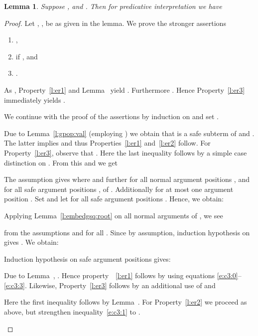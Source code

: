 \documentclass{LMCS}
\newtheorem{lemma}[thm]{Lemma}
\begin{document}
\begin{lemma}\label{l:embed:root}
  Suppose ,  and . 
  Then for predicative interpretation 
  we have 
  
\end{lemma}
\begin{proof}
  Let , ,  be as given in the lemma.
  We prove the stronger assertions
  \begin{enumerate}[labelsep=*,leftmargin=*]
  \item \label{l:er1} , 
  \item \label{l:er2}  if , and
  \item \label{l:er3} .
  \end{enumerate}
As , 
Property~\ref{l:er1} and Lemma~
yield  .
Furthermore
. 
Hence Property~\ref{l:er3} immediately
yields .


We continue with the proof of the assertions by induction on  
and set .
\begin{description}[leftmargin=0.3cm]
  \item[{\dcase{}}]
Due to Lemma~\ref{l:gpop:val} (employing ) 
we obtain that  is a safe subterm of 
and .
The latter implies  and thus
Properties~\ref{l:er1} and~\ref{l:er2} follow.
For Property~\ref{l:er3}, observe that 
    .
Here the last inequality follows by a simple case distinction on .
From this and  we get


  \item[\dcase{}]
    The assumption gives  where 
    and further  for all normal argument positions , and
     for all safe argument positions , of . 
    Additionally  for at most one argument position .
Set  and 
    let  for all safe argument positions 
    . Hence, we obtain:

    Applying Lemma~\ref{l:embedgsq:root} on all normal arguments of , we see
    
    from the assumptions  and  for all .
    Since  by assumption, induction hypothesis on  gives 
.
We obtain:

Induction hypothesis on safe argument positions  gives:

Due to Lemma~, . 
Hence property~~\ref{l:er1} follows by 
using equations \eqref{e:c3:0}--\eqref{e:c3:3}.
Likewise, Property~\ref{l:er3} follows by an additional use of
 and
    
Here the first inequality follows by Lemma~.
For Property~\ref{l:er2} we proceed as above, but strengthen inequality~\eqref{e:c3:1} 
to .




\end{description}
\end{proof}
\end{document}
